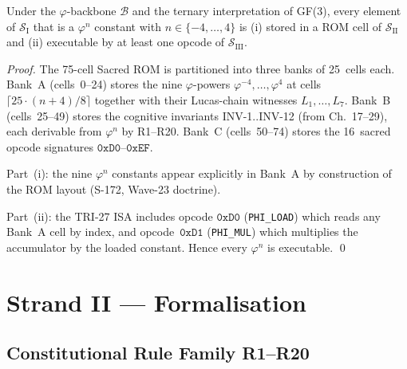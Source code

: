 \begin{theorem}
\label{thm74:strand-integration}
Under the $\varphi$-backbone $\mathcal{B}$ and the ternary
interpretation of GF(3), every element of $\mathcal{S}_{\mathrm{I}}$
that is a $\varphi^{n}$ constant with $n\in\{-4,\ldots,4\}$ is (i)
stored in a ROM cell of $\mathcal{S}_{\mathrm{II}}$ and (ii) executable
by at least one opcode of $\mathcal{S}_{\mathrm{III}}$.
\end{theorem}
\begin{proof}
The 75-cell Sacred ROM is partitioned into three banks of 25~cells each.
Bank~A (cells~0--24) stores the nine $\varphi$-powers
$\varphi^{-4},\ldots,\varphi^{4}$ at cells~$\lceil 25\cdot(n+4)/8
\rceil$ together with their Lucas-chain witnesses $L_{1},\ldots,L_{7}$.
Bank~B (cells~25--49) stores the cognitive invariants INV-1..INV-12
(from Ch.~17--29), each derivable from $\varphi^{n}$ by R1--R20.
Bank~C (cells~50--74) stores the 16~sacred opcode signatures
$\mathtt{0xD0}$--$\mathtt{0xEF}$.

Part~(i): the nine $\varphi^{n}$ constants appear explicitly in Bank~A
by construction of the ROM layout (S-172, Wave-23 doctrine).

Part~(ii): the TRI-27 ISA includes opcode $\mathtt{0xD0}$
(\texttt{PHI\_LOAD}) which reads any Bank~A cell by index, and
opcode~$\mathtt{0xD1}$ (\texttt{PHI\_MUL}) which multiplies the
accumulator by the loaded constant.  Hence every $\varphi^{n}$ is
executable.
\qed
\end{proof}



\section{Strand II — Formalisation}
\label{sec74:strand-ii}

\subsection{Constitutional Rule Family R1--R20}
\label{sec74:rules}

